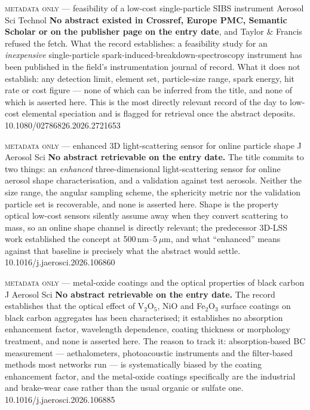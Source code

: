 \documentclass[10pt]{article}
\begin{document}
{\textsc{metadata only} --- feasibility of a low-cost single-particle SIBS instrument}
{Aerosol Sci Technol}
{\textbf{No abstract existed in Crossref, Europe PMC, Semantic Scholar or on the publisher
page on the entry date}, and Taylor \& Francis refused the fetch. What the record
establishes: a feasibility study for an \emph{inexpensive} single-particle
spark-induced-breakdown-spectroscopy instrument has been published in the field's
instrumentation journal of record. What it does not establish: any detection limit, element
set, particle-size range, spark energy, hit rate or cost figure --- none of which can be
inferred from the title, and none of which is asserted here. This is the most directly
relevant record of the day to low-cost elemental speciation and is flagged for retrieval once
the abstract deposits.}
{10.1080/02786826.2026.2721653}

{\textsc{metadata only} --- enhanced 3D light-scattering sensor for online particle shape}
{J Aerosol Sci}
{\textbf{No abstract retrievable on the entry date.} The title commits to two things: an
\emph{enhanced} three-dimensional light-scattering sensor for online aerosol shape
characterisation, and a validation against test aerosols. Neither the size range, the
angular sampling scheme, the sphericity metric nor the validation particle set is recoverable,
and none is asserted here. Shape is the property optical low-cost sensors silently assume
away when they convert scattering to mass, so an online shape channel is directly relevant;
the predecessor 3D-LSS work established the concept at 500\,nm--5\,$\mu$m, and what
``enhanced'' means against that baseline is precisely what the abstract would settle.}
{10.1016/j.jaerosci.2026.106860}

{\textsc{metadata only} --- metal-oxide coatings and the optical properties of black carbon}
{J Aerosol Sci}
{\textbf{No abstract retrievable on the entry date.} The record establishes that the optical
effect of V$_2$O$_5$, NiO and Fe$_2$O$_3$ surface coatings on black carbon aggregates has
been characterised; it establishes no absorption enhancement factor, wavelength dependence,
coating thickness or morphology treatment, and none is asserted here. The reason to track it:
absorption-based BC measurement --- aethalometers, photoacoustic instruments and the
filter-based methods most networks run --- is systematically biased by the coating
enhancement factor, and the metal-oxide coatings specifically are the industrial and
brake-wear case rather than the usual organic or sulfate one.}
{10.1016/j.jaerosci.2026.106885}
\end{document}
